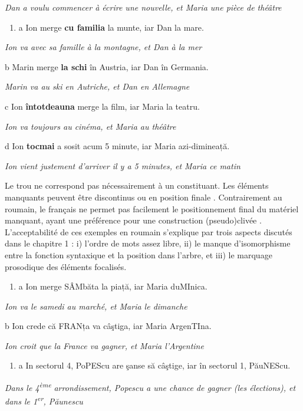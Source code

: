     \textit{Dan a voulu commencer à écrire une nouvelle, et Maria une pièce de théâtre}


\begin{enumerate}
\item \label{bkm:Ref289287997}a  Ion merge \textbf{cu familia} la munte, iar Dan la mare.


\end{enumerate}
{\itshape
Ion va avec sa famille à la montagne, et Dan à la mer}

  b  Marin merge \textbf{la schi}\textbf{} în Austria, iar Dan în Germania.

    \textit{Marin va au ski en Autriche, et Dan en Allemagne}

  c  Ion \textbf{întotdeauna} merge la film, iar Maria la teatru.

{\itshape
Ion va toujours au cinéma, et Maria au théâtre  } 

  d  Ion \textbf{tocmai} a sosit acum 5 minute, iar Maria azi-dimineață.

    \textit{Ion vient justement d'arriver il y a 5 minutes, et Maria ce matin}

Le trou ne correspond pas nécessairement à un constituant. Les éléments manquants peuvent être discontinus  ou en position finale . Contrairement au roumain, le français ne permet pas facilement le positionnement final du matériel manquant, ayant une préférence pour une construction (pseudo)clivée . L'acceptabilité de ces exemples en roumain s'explique par trois aspects discutés dans le chapitre 1 : i) l'ordre de mots assez libre, ii) le manque d'isomorphisme entre la fonction syntaxique et la position dans l'arbre, et iii) le marquage prosodique des éléments focalisés.


\begin{enumerate}
\item \label{bkm:Ref289289227}a  Ion merge S\^AMbăta la piață, iar Maria duMInica.


\end{enumerate}
{\itshape
Ion va le samedi au marché, et Maria le dimanche}

  b  Ion crede că FRANța va câştiga, iar Maria ArgenTIna.

    \textit{Ion croit que la France va gagner, et Maria l'Argentine}


\begin{enumerate}
\item \label{bkm:Ref289289250}a  In sectorul 4, PoPEScu are şanse să câştige, iar în sectorul 1, PăuNEScu.


\end{enumerate}
\textit{Dans le 4}\textit{\textsuperscript{ème}}\textit{ arrondissement, Popescu a une chance de gagner (les élections), et dans le 1}\textit{\textsuperscript{er}}\textit{, Păunescu}


